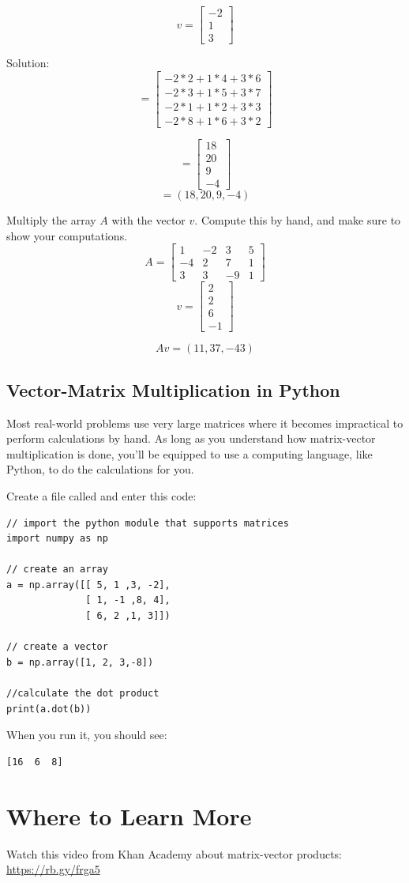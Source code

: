 $$v = \begin{bmatrix}
 -2  \\
 1 \\
 3 
\end{bmatrix}$$

Solution:
$$= \begin{bmatrix}
-2*2+1*4+3*6\\
-2*3+1*5+3*7\\
 -2*1+1*2+3*3\\
-2*8+1*6+3*2
\end{bmatrix}$$

$$= \begin{bmatrix}
18 \\
20\\
9\\
-4 
\end{bmatrix}$$
$$= (18,20,9,-4)$$

\begin{Exercise}[title={Vector Matrix Multiplication}, label=vector-matrix-multiply01]
Multiply the array $A$ with the vector $v$. Compute this by hand, and make sure to show your computations. 
$$A = \begin{bmatrix}
1 &-2  &3 &5  \\
-4  &2  &7 &1 \\
3  &3  &-9 &1
\end{bmatrix}$$
	$$v = 
	\begin{bmatrix}
		2 \\
 		2 \\
 		6 \\
 		-1
	\end{bmatrix}$$
\end{Exercise}
\begin{Answer}[ref=vector-matrix-multiply01]
$$Av = (11, 37, -43)$$
\end{Answer}

\subsection{Vector-Matrix Multiplication in Python}
Most real-world problems use very large matrices where it becomes impractical to perform calculations by hand. As long as you understand how matrix-vector multiplication is done, you'll be equipped to use a computing language, like Python, to do the calculations for you. 

Create a file called  and enter this code:

\begin{Verbatim}
// import the python module that supports matrices
import numpy as np

// create an array
a = np.array([[ 5, 1 ,3, -2], 
              [ 1, -1 ,8, 4], 
              [ 6, 2 ,1, 3]])

// create a vector 
b = np.array([1, 2, 3,-8])

//calculate the dot product
print(a.dot(b))
\end{Verbatim}

When you run it, you should see:
\begin{Verbatim}
[16  6  8]
\end{Verbatim}

\section{Where to Learn More}
Watch this video from Khan Academy about matrix-vector products: \url{https://rb.gy/frga5}

